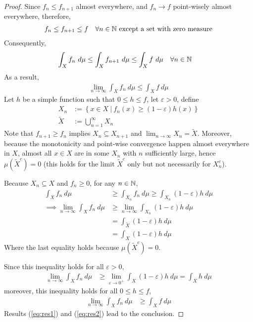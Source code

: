 \documentclass[11pt]{article}
\begin{document}
	\begin{proof}
		Since $f_{n} \leq f_{n+1}$ almost everywhere, and $f_n \to f$ point-wisely almost everywhere, therefore,
		\begin{align}
			f_n \leq f_{n+1} \leq f\quad \forall n \in \mathbb{N} \text{{ except a set with zero measure}}
		\end{align}
		Consequently,
		\begin{align}
			\int_X f_n\ d\mu &\leq \int_X f_{n+1}\ d\mu\leq \int_X f\ d\mu\quad \forall n \in \mathbb{N}
		\end{align}
		As a result,
		\begin{align}
			\lim_{n \to \infty} \int_X f_n\ d\mu \leq \int_X f\ d\mu \label{eq:res1}
		\end{align}
		Let $h$ be a simple function such that $0 \leq h \leq f$, let $\varepsilon > 0$, define
		\begin{align}
			X_n &:= \left\{x \in X\ |\ f_n(x) \geq (1 - \varepsilon) h(x) \right\} \\
			\tilde{X} &:= \bigcup_{n=1}^\infty X_n
		\end{align}
		Note that $f_{n+1} \geq f_n$ implies $X_{n} \subseteq X_{n+1}$ and $\lim_{n\to \infty} X_n = \tilde{X}$.
		Moreover, because the monotonicity and point-wise convergence happen almost everywhere in $X$, 
		almost all $x \in X$ are in some $X_n$ with $n$ sufficiently large, hence $\mu(\tilde{X}^c) = 0$ (this holds for the limit $\tilde{X}^c$ only but not necessarily for $X_n^c$).
		
		Because $X_n \subseteq X$ and $f_n \geq 0$, for any $n \in \mathbb{N}$,
		\begin{align}
			\int_X f_n\ d\mu &\geq \int_{X_n}f_n\ d\mu \geq \int_{X_n} (1 - \varepsilon) h\ d\mu \\
			\implies \lim_{n \to \infty} \int_X f_n\ d\mu &\geq \lim_{n \to \infty} \int_{X_n} (1 - \varepsilon) h\ d\mu \\
			&= \int_{\tilde{X}} (1 - \varepsilon) h\ d\mu \\
			&= \int_{X} (1 - \varepsilon) h\ d\mu
		\end{align}
		Where the last equality holds because $\mu(\tilde{X}^c) = 0$.
		
		Since this inequality holds for all $\varepsilon > 0$,
		\begin{align}
			\lim_{n \to \infty} \int_X f_n\ d\mu &\geq \lim_{\varepsilon \to 0^+} \int_{X} (1 - \varepsilon) h\ d\mu = \int_X h\ d\mu
		\end{align}
		moreover, this inequality holds for all $0 \leq h \leq f$,
		\begin{align}
			\lim_{n \to \infty} \int_X f_n\ d\mu &\geq \int_{X} f\ d\mu \label{eq:res2}
		\end{align}
		Results (\ref{eq:res1}) and (\ref{eq:res2}) lead to the conclusion.
	\end{proof}
	
\end{document}
